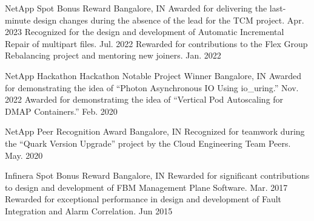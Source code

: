 




\begin{cventries}

  \honorentry
    {NetApp} %
    {Spot Bonus Reward} %
    {Bangalore, IN}
    {
	\honorsubentry
	  {Awarded for delivering the last-minute design changes during the absence of the lead for the TCM project.}
	  {Apr. 2023}
	\honorsubentry
	  {Recognized for the design and development of Automatic Incremental Repair of multipart files.}
	  {Jul. 2022}
	\honorsubentry
	  {Rewarded for contributions to the Flex Group Rebalancing project and mentoring new joiners.}
	  {Jan. 2022}
    }

  \honorentry
    {NetApp Hackathon} %
    {Hackathon Notable Project Winner} %
    {Bangalore, IN}
    {
	\honorsubentry
	  {Awarded for demonstrating the idea of ``Photon Asynchronous IO Using io\_uring.''}
	  {Nov. 2022} %
	\honorsubentry
	  {Awarded for demonstratimg the idea of ``Vertical Pod Autoscaling for DMAP Containers.''}
	  {Feb. 2020} %
    }

  \honorentry
    {NetApp} %
    {Peer Recognition Award} %
    {Bangalore, IN}
    {
	\honorsubentry
	  {Recognized for teamwork during the ``Quark Version Upgrade'' project by the Cloud Engineering Team Peers.} %
	  {May. 2020} %
    }

  \honorentry
    {Infinera} %
    {Spot Bonus Reward} %
    {Bangalore, IN}
    {
	\honorsubentry
	  {Rewarded for significant contributions to design and development of FBM Management Plane Software.}
	  {Mar. 2017} %
	\honorsubentry
	  {Rewarded for exceptional performance in design and development of Fault Integration and Alarm Correlation.} %
	  {Jun 2015} %
    }


\end{cventries}
